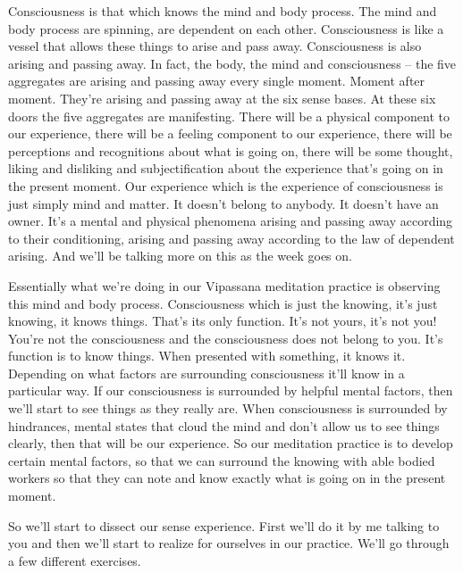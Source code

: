 \documentclass[letterpaper,10pt,english]{sphinxmanual}
\begin{document}
\sphinxAtStartPar
Consciousness  is  that  which  knows  the  mind  and  body  process. The
mind  and  body  process  are  spinning,  are  dependent  on  each  other.  Consciousness is like a vessel that allows these things to arise and pass away.
Consciousness is also arising and passing away. In fact, the body, the mind
and consciousness – the five aggregates are arising and passing away every
single moment. Moment after moment. They’re arising and passing away at
the six sense bases. At these six doors the five aggregates are manifesting.
There will be a physical component to our experience, there will be a feeling component to our experience, there will be perceptions and recognitions
about what is going on, there will be some thought, liking and disliking and
subjectification about the experience that’s going on in the present moment.
Our experience which is the experience of consciousness is just simply mind
and  matter.  It  doesn’t  belong  to  anybody.  It  doesn’t  have  an  owner.  It’s  a
mental and physical phenomena arising and passing away according to their
conditioning, arising and passing away according to the law of dependent
arising. And we’ll be talking more on this as the week goes on.

\sphinxAtStartPar
Essentially  what  we’re  doing  in  our  Vipassana  meditation  practice
is  observing  this  mind  and  body  process.  Consciousness  which  is  just  the
  knowing,  it’s  just  knowing,  it  knows  things.  That’s  its  only  function.  It’s
not yours, it’s not you! You’re not the consciousness and the consciousness
does not belong to you. It’s function is to know things. When presented with
something,  it  knows  it.  Depending  on  what  factors  are  surrounding  consciousness it’ll know in a particular way. If our consciousness is surrounded
by  helpful  mental  factors,  then  we’ll  start  to  see  things  as  they  really  are.
When consciousness is surrounded by hindrances, mental states that cloud
the mind and don’t allow us to see things clearly, then that will be our experience. So our meditation practice is to develop certain mental factors, so that
we can surround the knowing with able bodied workers so that they can note
and know exactly what is going on in the present moment.

\sphinxAtStartPar
So we’ll start to dissect our sense experience. First we’ll do it by me
talking to you and then we’ll start to realize for ourselves in our practice.
We’ll go through a few different exercises.
\end{document}
